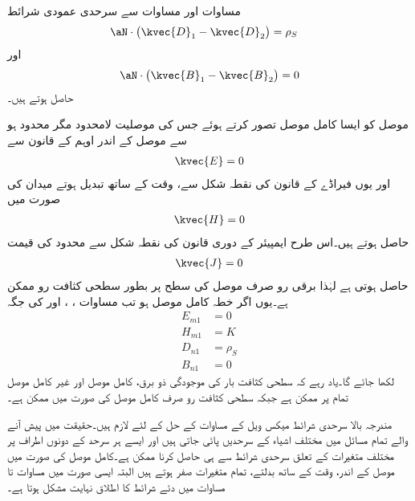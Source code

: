 مساوات  اور مساوات  سے سرحدی عمودی شرائط
\begin{align}\label{مساوات_میکس_ویل_سرحدی_شرائط_بدلتے_میدان_پ}
\aN \cdot \left(\kvec{D}_1-\kvec{D}_2 \right)&=\rho_S
\end{align}
اور
\begin{align}\label{مساوات_میکس_ویل_سرحدی_شرائط_بدلتے_میدان_ت}
\aN \cdot \left(\kvec{B}_1-\kvec{B}_2 \right)=0
\end{align}
حاصل ہوتے ہیں۔

موصل کو ایسا کامل موصل تصور کرتے ہوئے جس کی موصلیت لامحدود مگر  محدود ہو سے موصل کے اندر اوہم کے قانون سے
\begin{align}
\kvec{E}=0
\end{align}
اور یوں فیراڈے کے قانون کی نقطہ شکل سے، وقت کے ساتھ تبدیل ہوتے میدان کی صورت میں
\begin{align}
\kvec{H}=0
\end{align}
حاصل ہوتے ہیں۔اس طرح ایمپیئر کے دوری قانون کی نقطہ شکل سے محدود  کی قیمت
\begin{align}
\kvec{J}=0
\end{align}
حاصل ہوتی ہے لہٰذا برقی رو صرف موصل کی سطح پر بطور سطحی کثافت رو  ممکن ہے۔یوں اگر خطہ  کامل موصل ہو تب مساوات ، ،  اور  کی جگہ
\begin{align}
E_{m1}&=0   \label{مساوات_میکس_ویل_کامل_موصل_سرحدی_شرط_الف}\\
H_{m1}&=K   \label{مساوات_میکس_ویل_کامل_موصل_سرحدی_شرط_ب}\\
D_{n1}&=\rho_S    \label{مساوات_میکس_ویل_کامل_موصل_سرحدی_شرط_پ}\\
B_{n1}&=0    \label{مساوات_میکس_ویل_کامل_موصل_سرحدی_شرط_ت}
\end{align}
لکھا جائے گا۔یاد رہے کہ سطحی کثافت بار کی موجودگی ذو برق، کامل موصل اور غیر کامل موصل تمام پر ممکن ہے جبکہ سطحی کثافت رو  صرف کامل موصل کی صورت میں ممکن ہے۔

مندرجہ بالا سرحدی شرائط میکس ویل کے مساوات کے حل کے لئے لازم  ہیں۔حقیقت میں پیش آنے والے تمام مسائل میں مختلف اشیاء کے سرحدیں پائی جاتی ہیں اور ایسے ہر سرحد کے دونوں اطراف پر مختلف متغیرات کے تعلق سرحدی شرائط سے ہی حاصل کرنا ممکن ہے۔کامل موصل کی صورت میں موصل کے اندر،  وقت کے ساتھ بدلتے، تمام متغیرات صفر ہوتے ہیں البتہ ایسی صورت میں مساوات  تا مساوات  میں دئے شرائط کا اطلاق نہایت مشکل ہوتا ہے۔

